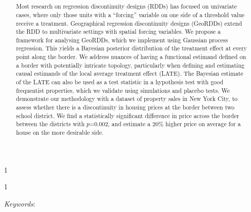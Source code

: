 \documentclass[12pt]{article}
\newcommand{\blind}{1}
\begin{document}
\doublespacing



\blind
{
\title{
    \Large
    \bf
    \georddtitle
}
\author{\georddauthor}
\maketitle
} \fi

\blind
{
  \bigskip
  \bigskip
  \bigskip
  \begin{center}
    {\LARGE\bf \georddtitle}
\end{center}
  \medskip
} \fi
\begin{abstract}
    Most research on regression discontinuity designs (RDDs) has focused on univariate cases, where only those units with a ``forcing'' variable on one side of a threshold value receive a treatment.
    Geographical regression discontinuity designs (GeoRDDs) extend the RDD to multivariate settings with spatial forcing variables.
    We propose a framework for analysing GeoRDDs, which we implement using Gaussian process regression. 
    This yields a Bayesian posterior distribution of the treatment effect at every point along the border.
    We address nuances of having a functional estimand defined on a border with potentially intricate topology, particularly when defining and estimating causal estimands of the local average treatment effect (LATE).
    The Bayesian estimate of the LATE can also be used as a test statistic
    in a hypothesis test with good frequentist properties, 
    which we validate using simulations and placebo tests.
    We demonstrate our methodology with a dataset of property sales in New York City,
    to assess whether there is a discontinuity in housing prices at the border between two school district.
    We find a statistically significant difference in price across the border between the districts with \(p\)=0.002, and estimate a 20\%  higher price on average for a house on the more desirable side.
\end{abstract}

\noindent%
{\it Keywords}: \georddkeywords
\vfill
\newpage


\end{document}
